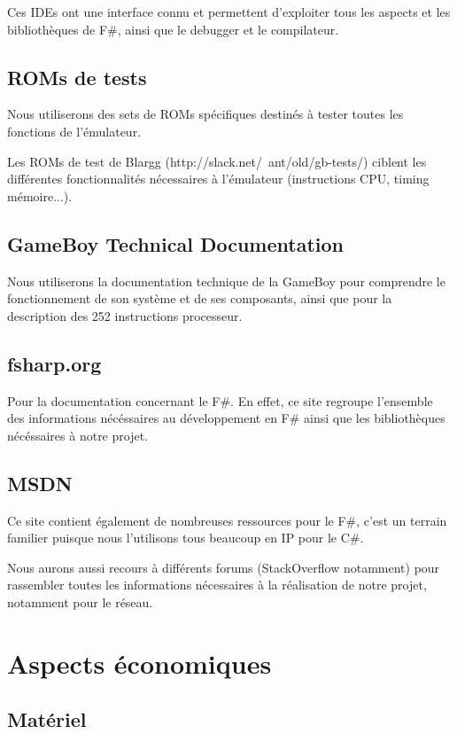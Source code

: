 \documentclass[12pt, a4paper]{article}
\begin{document}
Ces IDEs ont une interface connu et permettent d'exploiter tous les aspects et les bibliothèques de F\#, ainsi que le debugger et le compilateur.

\bigskip
\subsection{ROMs de tests}
Nous utiliserons des sets de ROMs spécifiques destinés à tester toutes les fonctions de l'émulateur.
\medskip

Les ROMs de test de Blargg (http://slack.net/~ant/old/gb-tests/) ciblent les différentes fonctionnalités nécessaires à l'émulateur (instructions CPU, timing mémoire...).

\bigskip
\subsection{GameBoy Technical Documentation}
 Nous utiliserons la documentation technique de la GameBoy pour comprendre le fonctionnement de son système et de ses composants, ainsi que pour la description des 252 instructions processeur.

\pagebreak

\bigskip
\subsection{fsharp.org}
Pour la documentation concernant le F\#. En effet, ce site regroupe l'ensemble des informations nécéssaires au développement en F\# ainsi que les bibliothèques nécéssaires à notre projet.  

\bigskip
\subsection{MSDN}
Ce site contient également de nombreuses ressources pour le F\#, c'est un terrain familier puisque nous l'utilisons tous beaucoup en IP pour le C\#.
\medskip

Nous aurons aussi recours à différents forums (StackOverflow notamment) pour rassembler toutes les informations nécessaires à la réalisation de notre projet, notamment pour le réseau.

\pagebreak

\section{Aspects économiques}
\subsection{Matériel}
\end{document}
